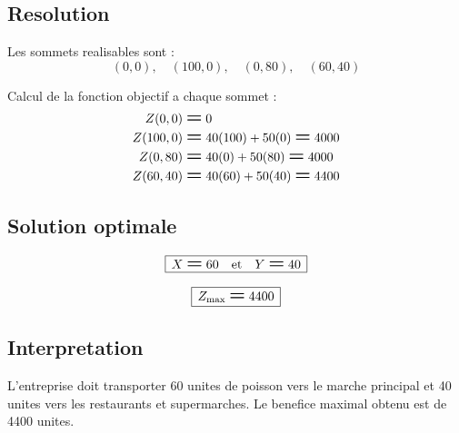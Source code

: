\documentclass[12pt,a4paper]{article}
\newcommand{\Eq}{\mathrel{\text{\Large\bfseries =}}}
\newcommand{\BoxedEq}[1]{%
  \begin{equation*}
    \boxed{\,\displaystyle #1\,}
  \end{equation*}%
}
\begin{document}
\subsection*{Resolution}
Les sommets realisables sont :
\[
(0,0), \quad (100,0), \quad (0,80), \quad (60,40)
\]

Calcul de la fonction objectif a chaque sommet :
\[
\begin{aligned}
Z(0,0)     &\Eq 0 \\
Z(100,0)   &\Eq 40(100) + 50(0)  \Eq 4000 \\
Z(0,80)    &\Eq 40(0) + 50(80)   \Eq 4000 \\
Z(60,40)   &\Eq 40(60) + 50(40)  \Eq 4400
\end{aligned}
\]

\subsection*{Solution optimale}

\BoxedEq{X \Eq 60 \quad\text{et}\quad Y \Eq 40}

\BoxedEq{Z_{\mathrm{max}} \Eq 4400}

\subsection*{Interpretation}
L'entreprise doit transporter 60 unites de poisson vers le marche principal et 40 unites vers les restaurants et supermarches. Le benefice maximal obtenu est de 4400 unites.
\end{document}

